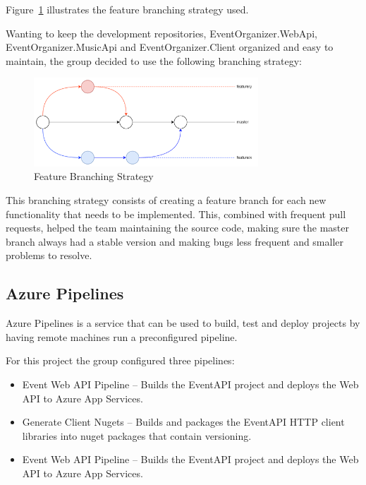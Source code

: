 Figure~\ref{fig:BranchingStrategy} illustrates the feature branching strategy used.

Wanting to keep the development repositories, EventOrganizer.WebApi, EventOrganizer.MusicApi and EventOrganizer.Client organized and easy to maintain, the group decided to use the following branching strategy:

\begin{figure}[!ht]
	\centering
	\includegraphics[width=0.75\textwidth]{./Chapter4/Figures/BranchingStrategy.png}
	\caption{Feature Branching Strategy}
	\label{fig:BranchingStrategy}
\end{figure}

This branching strategy consists of creating a feature branch for each new functionality that needs to be implemented. This, combined with frequent pull requests, helped the team maintaining the source code, making sure the master branch always had a stable version and making bugs less frequent and smaller problems to resolve.

\subsection{Azure Pipelines}
Azure Pipelines is a service that can be used to build, test and deploy projects by having remote machines run a preconfigured pipeline.

For this project the group configured three pipelines:

\begin{itemize}
	\item Event Web API Pipeline – Builds the EventAPI project and deploys the Web API to Azure App Services.
	\item Generate Client Nugets – Builds and packages the EventAPI HTTP client libraries into nuget packages that contain versioning.
	\item Event Web API Pipeline – Builds the EventAPI project and deploys the Web API to Azure App Services.
	
\end{itemize}


